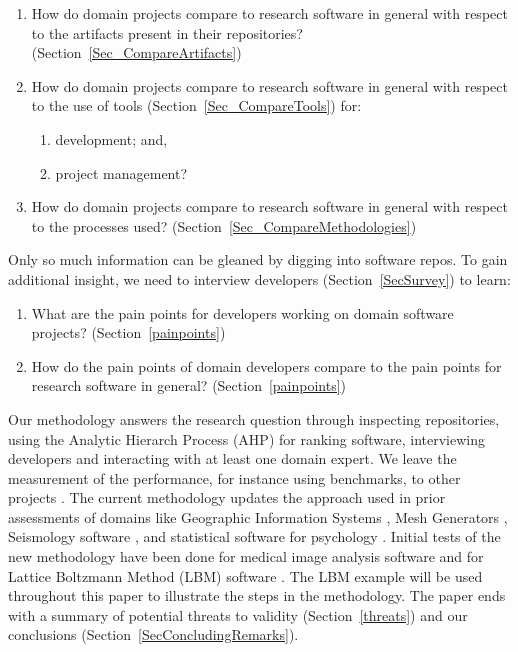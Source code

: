 \documentclass[runningheads]{llncs}
\newcounter{rqnum} %
\newcommand{\rqref}[1]{RQ\ref{#1}}
\begin{document}
\begin{enumerate}
  \item [RQ\refstepcounter{rqnum}\therqnum \label{RQ_CompareArtifacts}:] How
	do domain projects compare to research software in general with respect to the
	artifacts present in their repositories? (Section~\ref{Sec_CompareArtifacts})
	\item [RQ\refstepcounter{rqnum}\therqnum \label{RQ_CompareToolsProjMngmnt}:]
	How do domain projects compare to research software in general with respect to
	the use of tools (Section~\ref{Sec_CompareTools}) for:
	\begin{enumerate} 
		\item [\rqref{RQ_CompareToolsProjMngmnt}.a] development; and,
		\item [\rqref{RQ_CompareToolsProjMngmnt}.b] project management?
	\end{enumerate}
	\item [RQ\refstepcounter{rqnum}\therqnum \label{RQ_CompareMethodologies}:]
	How do domain projects compare to research software in general with respect to
	the processes used? (Section~\ref{Sec_CompareMethodologies})
\end{enumerate}	

Only so much information can be gleaned by digging into software repos.
To gain additional insight, we need to interview developers
(Section~\ref{SecSurvey}) to learn:

\begin{enumerate}
	\item [RQ\refstepcounter{rqnum}\therqnum \label{RQ_PainPoints}:] What are
	the pain points for developers working on domain software projects?
	(Section~\ref{painpoints})
	\item [RQ\refstepcounter{rqnum}\therqnum \label{RQ_ComparePainPoints}:] How
	do the pain points of domain developers compare to the pain points
	for research software in general? (Section~\ref{painpoints})
\end{enumerate}

Our methodology answers the research question through inspecting repositories,
using the Analytic Hierarch Process (AHP) for ranking software, interviewing
developers and interacting with at least one domain expert.  We leave the
measurement of the performance, for instance using benchmarks, to other projects
\cite{KaagstromEtAl1998}. The current methodology updates the approach used in
prior assessments of domains like Geographic Information Systems
\cite{SmithEtAl2018_arXivGIS}, Mesh Generators \cite{SmithEtAl2016}, Seismology
software \cite{SmithEtAl2018}, and statistical software for psychology
\cite{SmithEtAl2018_StatSoft}.  Initial tests of the new methodology have been
done for medical image analysis software \cite{Dong2021} and for Lattice
Boltzmann Method (LBM) software \cite{Michalski2021}.  The LBM example will be
used throughout this paper to illustrate the steps in the methodology.  The
paper ends with a summary of potential threats to validity
(Section~\ref{threats}) and our conclusions
(Section~\ref{SecConcludingRemarks}).
\end{document}
